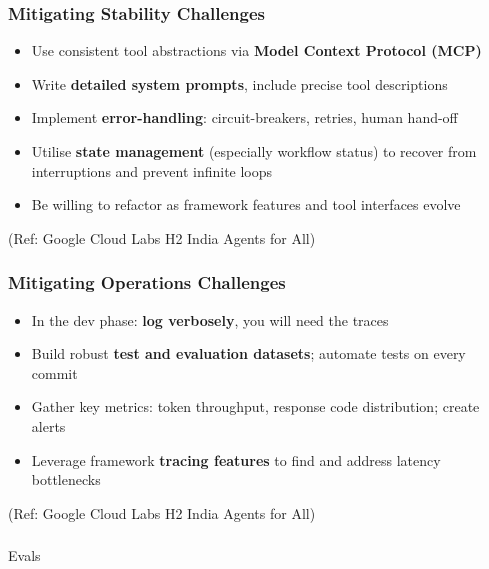 \begin{frame}[fragile]\frametitle{Mitigating Stability Challenges}
    \begin{itemize}
        \item Use consistent tool abstractions via \textbf{Model Context Protocol (MCP)}
        \item Write \textbf{detailed system prompts}, include precise tool descriptions
        \item Implement \textbf{error-handling}: circuit-breakers, retries, human hand-off
        \item Utilise \textbf{state management} (especially workflow status) to recover from interruptions and prevent infinite loops
        \item Be willing to refactor as framework features and tool interfaces evolve
    \end{itemize}
	
		{\tiny (Ref: Google Cloud Labs H2 India Agents for All)}

\end{frame}

\begin{frame}[fragile]\frametitle{Mitigating Operations Challenges}
    \begin{itemize}
        \item In the dev phase: \textbf{log verbosely}, you will need the traces
        \item Build robust \textbf{test and evaluation datasets}; automate tests on every commit
        \item Gather key metrics: token throughput, response code distribution; create alerts
        \item Leverage framework \textbf{tracing features} to find and address latency bottlenecks
    \end{itemize}
	
		{\tiny (Ref: Google Cloud Labs H2 India Agents for All)}

\end{frame}

\begin{frame}[fragile]\frametitle{}
\begin{center}
{\Large Evals}

\end{center}
\end{frame}

